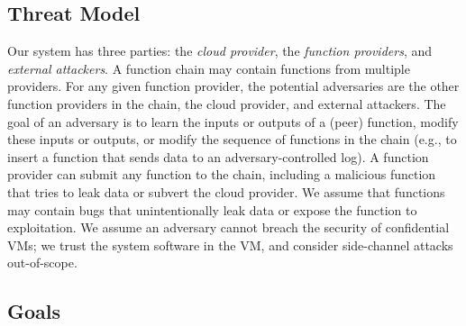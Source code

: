 \subsection{Threat Model}
\label{sec:threat-model}

Our \SystemName system has three parties: the \emph{cloud provider}, the \emph{function
providers}, and \emph{external attackers}.
%
A function chain may contain functions from multiple providers.
%
For any given function provider, the potential adversaries
are the other function providers in the chain, the cloud provider, and
external attackers.
%
The goal of an adversary is to learn the inputs or outputs of a (peer)
function, modify these inputs or outputs, or modify the sequence of functions
in the chain (e.g., to insert a function that sends data to an
adversary-controlled log).
%
A function provider can submit any function to the chain, including a
malicious function that tries to leak data or subvert the cloud
provider.
%
We assume that functions may contain bugs that unintentionally leak
data or expose the function to exploitation.
%
We assume an adversary cannot breach the security of confidential VMs; we trust
the system software in the VM, and consider side-channel attacks out-of-scope.
%

\subsection{Goals}
\label{sec:goals}





